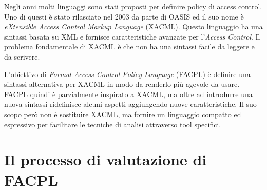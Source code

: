 \label{cap:facpl}
Negli anni molti linguaggi sono stati proposti per definire policy di access control. Uno di questi è stato rilasciato nel 2003 da parte di OASIS ed il suo nome è \textit{eXtensible Access Control Markup Language} (XACML). Questo linguaggio ha una sintassi basata su XML e fornisce caratteristiche avanzate per l'\textit{Access Control}. Il problema fondamentale di XACML è che non ha una sintassi facile da leggere e da scrivere. \\ \par
L'obiettivo di \textit{Formal Access Control Policy Language} (FACPL) è definire una sintassi alternativa per XACML in modo da renderlo più agevole da usare.
FACPL quindi è parzialmente inspirato a XACML, ma oltre ad introdurre una nuova sintassi ridefinisce alcuni aspetti aggiungendo nuove caratteristiche. Il suo scopo però non è sostituire XACML, ma fornire un linguaggio compatto ed espressivo per facilitare le tecniche di analisi attraverso tool specifici.


\section{Il processo di valutazione di FACPL}
\label{sec:valutazione_facpl}


